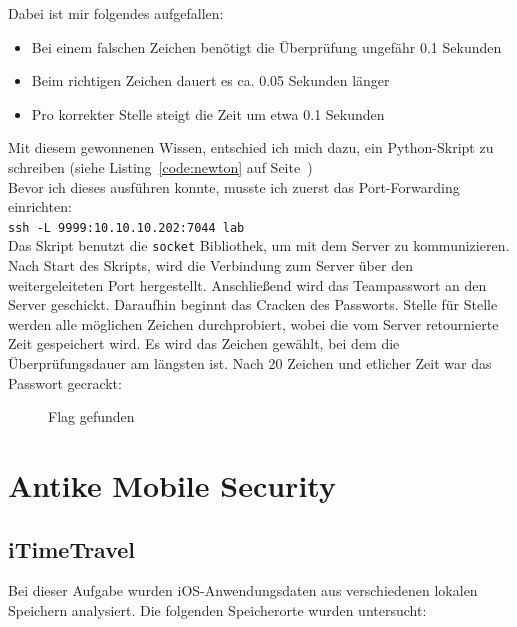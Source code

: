 \documentclass[12pt, a4paper, titlepage, oneside]{scrartcl}
\begin{document}
	Dabei ist mir folgendes aufgefallen:
	\begin{itemize}
		\item Bei einem falschen Zeichen benötigt die Überprüfung ungefähr 0.1 Sekunden

		\item Beim richtigen Zeichen dauert es ca. 0.05 Sekunden länger

		\item Pro korrekter Stelle steigt die Zeit um etwa 0.1 Sekunden
	\end{itemize}
	Mit diesem gewonnenen Wissen, entschied ich mich dazu, ein Python-Skript zu schreiben
	(siehe Listing~\ref*{code:newton} auf Seite~\pageref*{code:newton}) \\ Bevor ich
	dieses ausführen konnte, musste ich zuerst das Port-Forwarding einrichten: \\ \lstinline{ssh -L 9999:10.10.10.202:7044 lab}
	\\ Das Skript benutzt die \lstinline{socket} Bibliothek, um mit dem Server zu
	kommunizieren. Nach Start des Skripts, wird die Verbindung zum Server über den
	weitergeleiteten Port hergestellt. Anschließend wird das Teampasswort an den Server
	geschickt. Daraufhin beginnt das Cracken des Passworts. Stelle für Stelle werden
	alle möglichen Zeichen durchprobiert, wobei die vom Server retournierte Zeit
	gespeichert wird. Es wird das Zeichen gewählt, bei dem die Überprüfungsdauer
	am längsten ist. Nach 20 Zeichen und etlicher Zeit war das Passwort gecrackt:

	\begin{figure}[h!]
		\centering
		\caption{Flag gefunden}
		\label{fig:newton2}
	\end{figure}

	\newpage

	\section{Antike Mobile Security}

	\subsection{iTimeTravel}
	Bei dieser Aufgabe wurden iOS-Anwendungsdaten aus verschiedenen lokalen
	Speichern analysiert. Die folgenden Speicherorte wurden untersucht:
\end{document}
